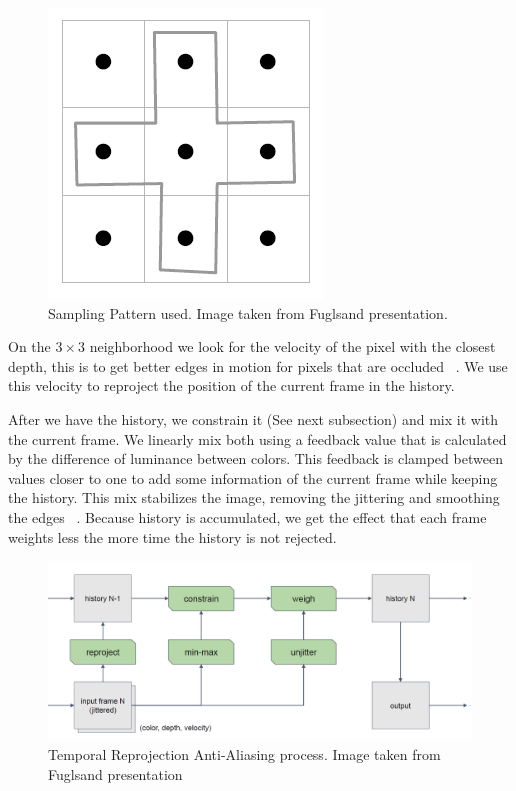 \documentclass{cslthse-msc}
\begin{document}
\begin{figure}[!hbt]
	\centering
	\includegraphics[scale=0.3]{images/sampling_pattern.png}
	\caption{Sampling Pattern used. Image taken from Fuglsand presentation. \protect\cite{Fuglsand2016}}\label{fig:samplingpattern}
\end{figure}

On the $3\times 3$ neighborhood we look for the velocity of the pixel with the closest depth, this is to get better edges in motion for pixels that are occluded ~\cite{Fuglsand2016}. We use this velocity to reproject the position of the current frame in the history. ~\cite{Fuglsand2016,XU2016}

After we have the history, we constrain it (See next subsection) and mix it with the current frame. We linearly mix both using a feedback value that is calculated by the difference of luminance between colors. This feedback is clamped between values closer to one to add some information of the current frame while keeping the history. This mix stabilizes the image, removing the jittering and smoothing the edges ~\cite{Fuglsand2016,XU2016}. Because history is accumulated, we get the effect that each frame weights less the more time the history is not rejected. ~\cite{Fuglsand2016}

\begin{figure}[!hbt]
	\centering
	\includegraphics[scale=0.4]{images/sampling_process.png}
	\caption{Temporal Reprojection Anti-Aliasing process. Image taken from Fuglsand presentation \protect\cite{Fuglsand2016}}\label{fig:samplingprocess}
\end{figure}
\end{document}

